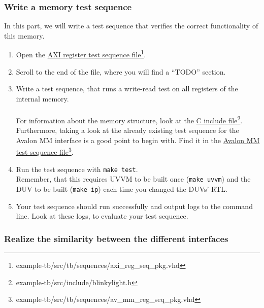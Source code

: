 \subsubsection{Write a memory test sequence}

In this part, we will write a test sequence that verifies the correct functionality of this memory.

\begin{enumerate}
      \item Open the \href{../../example-tb/src/tb/sequences/axi\_reg\_seq\_pkg.vhd} {AXI register test sequence file}\footnote{example-tb/src/tb/sequences/axi\_reg\_seq\_pkg.vhd}.
      \item Scroll to the end of the file, where you will find a ``TODO'' section.
      \item Write a test sequence, that runs a write-read test on all registers of the internal memory. \\
            \\
            For information about the memory structure, look at the \href{example-tb/src/include/blinkylight.h}{C include file}\footnote{example-tb/src/include/blinkylight.h}.\\
            Furthermore, taking a look at the already existing test sequence for the Avalon MM interface is a good point to begin with. Find it in the \href{example-tb/src/tb/sequences/av\_mm\_reg\_seq\_pkg.vhd}{Avalon MM test sequence file}\footnote{example-tb/src/tb/sequences/av\_mm\_reg\_seq\_pkg.vhd}.

      \item Run the test sequence with \texttt{make test}.\\
            Remember, that this requires UVVM to be built once (\texttt{make uvvm}) and the DUV to be built (\texttt{make ip}) each time you changed the DUVs' RTL.

      \item Your test sequence should run successfully and output logs to the command line. Look at these logs, to evaluate your test sequence.
\end{enumerate}

\subsubsection{Realize the similarity between the different interfaces}

